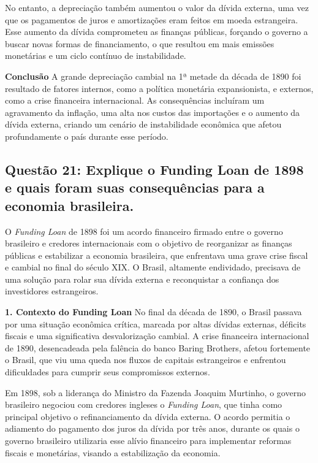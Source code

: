 \documentclass[a4paper,12pt]{article}[abntex2]
\begin{document}
No entanto, a depreciação também aumentou o valor da dívida externa, uma vez que os pagamentos de juros e amortizações eram feitos em moeda estrangeira. Esse aumento da dívida comprometeu as finanças públicas, forçando o governo a buscar novas formas de financiamento, o que resultou em mais emissões monetárias e um ciclo contínuo de instabilidade.

\textbf{Conclusão}
A grande depreciação cambial na 1ª metade da década de 1890 foi resultado de fatores internos, como a política monetária expansionista, e externos, como a crise financeira internacional. As consequências incluíram um agravamento da inflação, uma alta nos custos das importações e o aumento da dívida externa, criando um cenário de instabilidade econômica que afetou profundamente o país durante esse período.

\subsection{\textbf{Questão 21: Explique o Funding Loan de 1898 e quais foram suas consequências para a economia brasileira.}}

O \textit{Funding Loan} de 1898 foi um acordo financeiro firmado entre o governo brasileiro e credores internacionais com o objetivo de reorganizar as finanças públicas e estabilizar a economia brasileira, que enfrentava uma grave crise fiscal e cambial no final do século XIX. O Brasil, altamente endividado, precisava de uma solução para rolar sua dívida externa e reconquistar a confiança dos investidores estrangeiros.

\textbf{1. Contexto do Funding Loan}
No final da década de 1890, o Brasil passava por uma situação econômica crítica, marcada por altas dívidas externas, déficits fiscais e uma significativa desvalorização cambial. A crise financeira internacional de 1890, desencadeada pela falência do banco Baring Brothers, afetou fortemente o Brasil, que viu uma queda nos fluxos de capitais estrangeiros e enfrentou dificuldades para cumprir seus compromissos externos.

Em 1898, sob a liderança do Ministro da Fazenda Joaquim Murtinho, o governo brasileiro negociou com credores ingleses o \textit{Funding Loan}, que tinha como principal objetivo o refinanciamento da dívida externa. O acordo permitia o adiamento do pagamento dos juros da dívida por três anos, durante os quais o governo brasileiro utilizaria esse alívio financeiro para implementar reformas fiscais e monetárias, visando a estabilização da economia.
\end{document}
